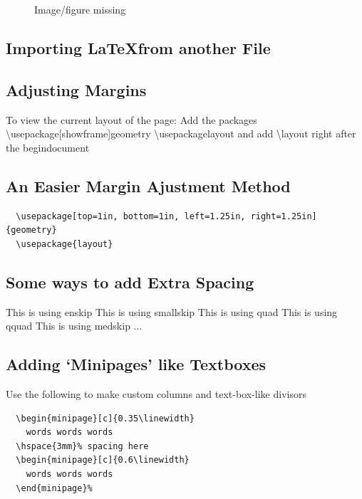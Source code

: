 \documentclass[12pt,twoside,a4paper]{article}
\begin{document}
\begin{figure}[htbp]
  \centering
  \caption{Image/figure missing}
\end{figure}

\newpage
\subsection*{Importing \LaTeX from another File}

\subsection*{Adjusting Margins}
To view the current layout of the page:
Add the packages
\textbackslash usepackage[showframe]{geometry}
\textbackslash usepackage{layout}
and add \textbackslash layout right after the begin{document}

\subsection*{An Easier Margin Ajustment Method}
\begin{verbatim}
  \usepackage[top=1in, bottom=1in, left=1.25in, right=1.25in]{geometry}
  \usepackage{layout}

\end{verbatim}

\subsection*{Some ways to add Extra Spacing}
This is using enskip \enskip This is using smallskip \smallskip This is using quad \quad This is using qquad \qquad This is using medskip \medskip ...

\newpage
\subsection*{Adding `Minipages' like Textboxes}
Use the following to make custom columns and text-box-like divisors
\begin{verbatim}
  \begin{minipage}[c]{0.35\linewidth}
    words words words
  \hspace{3mm}% spacing here
  \begin{minipage}[c]{0.6\linewidth}
    words words words
  \end{minipage}%
\end{verbatim}
\end{document}
